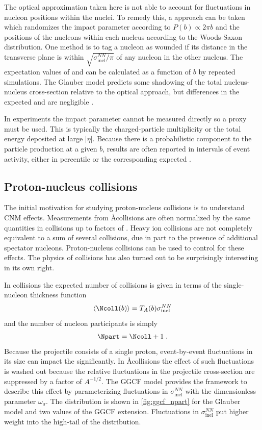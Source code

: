 The optical approximation taken here is not able to account for fluctuations in nucleon positions within the nuclei.
To remedy this, a \mc approach can be taken which randomizes the impact parameter according to $P(b) \propto 2\pi b$ and the positions of the nucleons within each nucleus according to the Woods-Saxon distribution.
One method is to tag a nucleon as wounded if its distance in the transverse plane is within $\sqrt{\sigma^{NN}_\mathrm{inel}/\pi}$ of any nucleon in the other nucleus.
The expectation values of \Ncoll and \Npart can be calculated as a function of $b$ by repeated simulations. 
The Glauber \mc model predicts some shadowing of the total nucleus-nucleus cross-section relative to the optical approach, but differences in the expected \Ncoll and \Npart are negligible \cite{Miller:2007ri}. %

In experiments the impact parameter cannot be measured directly so a proxy must be used.
This is typically the charged-particle multiplicity or the total energy deposited at large $|\eta|$.
Because there is a probabilistic component to the particle production at a given $b$, results are often reported in intervals of event activity, either in percentile or the corresponding expected \Npart.

\subsection{Proton-nucleus collisions}
The initial motivation for studying proton-nucleus collisions is to understand \ac{CNM} effects.
Measurements from \AA collisions are often normalized by the same quantities in \pp collisions up to factors of \Npart.
Heavy ion collisions are not completely equivalent to a sum of several \pp collisions, due in part to the presence of additional spectator nucleons.
Proton-nucleus collisions can be used to control for these effects.
The physics of \pA collisions has also turned out to be surprisingly interesting in its own right.

In \pA collisions the expected number of collisions is given in terms of the single-nucleon thickness function
\begin{equation}
  \langle \Ncoll(b) \rangle = T_A(b) \sigma^{NN}_\mathrm{inel}
\end{equation}
and the number of nucleon participants is simply
\begin{equation}
  \Npart = \Ncoll + 1 \;.
\end{equation}
Because the projectile consists of a single proton, event-by-event fluctuations in its size can impact the \Npart significantly.
In \AA collisions the effect of such fluctuations is washed out because the relative fluctuations in the projectile cross-section are suppressed by a factor of $A^{-1/2}$.
The \ac{GGCF} model provides the framework to describe this effect by parameterizing fluctuations in $\sigma^{NN}_\mathrm{inel}$ with the dimensionless parameter $\omega_\sigma$.
The \Npart distribution is shown in \cref{fig:ggcf_npart} for the Glauber model and two values of the \ac{GGCF} extension.
Fluctuations in $\sigma^{NN}_\mathrm{inel}$ put higher weight into the high-\Npart tail of the distribution.

